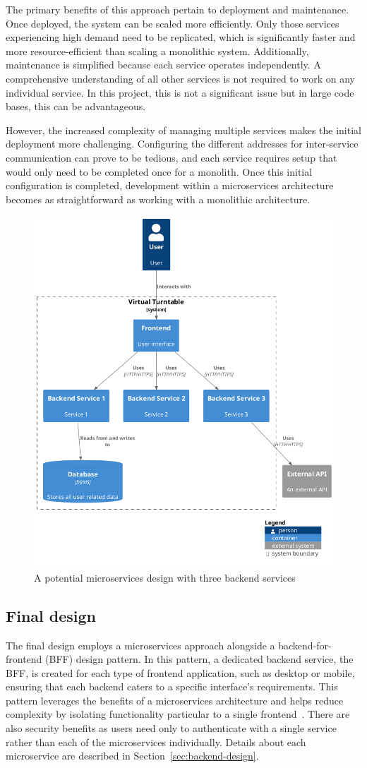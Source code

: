 The primary benefits of this approach pertain to deployment and maintenance. Once deployed, the system can be scaled more efficiently. Only those services experiencing high demand need to be replicated, which is significantly faster and more resource-efficient than scaling a monolithic system. Additionally, maintenance is simplified because each service operates independently. A comprehensive understanding of all other services is not required to work on any individual service. In this project, this is not a significant issue but in large code bases, this can be advantageous.

However, the increased complexity of managing multiple services makes the initial deployment more challenging. Configuring the different addresses for inter-service communication can prove to be tedious, and each service requires setup that would only need to be completed once for a monolith. Once this initial configuration is completed, development within a microservices architecture becomes as straightforward as working with a monolithic architecture.

\begin{figure} [H]
    \centering
    \includegraphics[width=0.4\linewidth]{figures/microservices_arch.png}
    \caption{A potential microservices design with three backend services}
    \label{fig:microservices-arch}
\end{figure}

\subsection{Final design}
The final design employs a microservices approach alongside a backend-for-frontend (BFF) design pattern. In this pattern, a dedicated backend service, the BFF, is created for each type of frontend application, such as desktop or mobile, ensuring that each backend caters to a specific interface’s requirements. This pattern leverages the benefits of a microservices architecture and helps reduce complexity by isolating functionality particular to a single frontend~\cite{BFF}. There are also security benefits as users need only to authenticate with a single service rather than each of the microservices individually. Details about each microservice are described in Section~\ref{sec:backend-design}.


